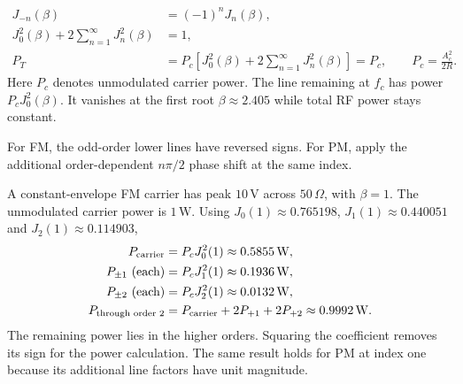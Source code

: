 \documentclass[12pt,a4paper]{article}
\begin{document}
\begin{tcolorbox}[formulabox, title={Bessel Identities and Spectrum Power}]
\[
\begin{aligned}
 J_{-n}(\beta)&=(-1)^n J_n(\beta),\\
 J_0^2(\beta)+2\sum_{n=1}^{\infty}J_n^2(\beta)&=1,\\
 P_T&=P_c\left[J_0^2(\beta)+2\sum_{n=1}^{\infty}J_n^2(\beta)\right]
      =P_c,\qquad P_c=\frac{A_c^2}{2R}.
\end{aligned}
\]
Here $P_c$ denotes unmodulated carrier power. The line remaining at $f_c$ has power $P_c J_0^2(\beta)$. It vanishes at the first root $\beta\approx2.405$ while total RF power stays constant.
\end{tcolorbox}

\begin{tcolorbox}[tikzbox, unbreakable, title={FM and PM Line Magnitudes at Index One}]
\centering
{}\par
\small For FM, the odd-order lower lines have reversed signs. For PM, apply the additional order-dependent $n\pi/2$ phase shift at the same index.
\end{tcolorbox}

\begin{tcolorbox}[examplebox, title={Calculate Carrier and Sideband Power from Bessel Coefficients}]
A constant-envelope FM carrier has peak $10\,\mathrm V$ across $50\,\Omega$, with $\beta=1$. The unmodulated carrier power is $1\,\mathrm W$. Using $J_0(1)\approx0.765198$, $J_1(1)\approx0.440051$ and $J_2(1)\approx0.114903$,
\[
\begin{aligned}
 P_{\rm carrier} &= P_cJ_0^2(1)\approx0.5855\,\mathrm W,\\
 P_{\pm1}\ \text{(each)} &=P_c J_1^2(1)\approx0.1936\,\mathrm W,\\
 P_{\pm2}\ \text{(each)} &=P_c J_2^2(1)\approx0.0132\,\mathrm W,\\
 P_{\text{through order 2}}
   &=P_{\rm carrier}+2P_{+1}+2P_{+2}\approx0.9992\,\mathrm W.
\end{aligned}
\]
The remaining power lies in the higher orders. Squaring the coefficient removes its sign for the power calculation. The same result holds for PM at index one because its additional line factors have unit magnitude.
\end{tcolorbox}
\end{document}
